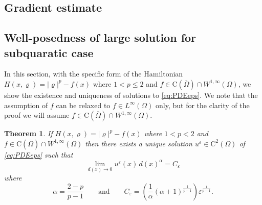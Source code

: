 \documentclass[11pt,reqno]{amsart}
\numberwithin{figure}{section}
\theoremstyle{plain}
\newtheorem{thm}{Theorem}[section]
\theoremstyle{remark}
\numberwithin{equation}{section}
\begin{document}
\subsection{Gradient estimate} 





\subsection{Well-posedness of large solution for subquaratic case}

In this section, with the specific form of the Hamiltonian $H(x,\varrho) = |\varrho|^p - f(x)$ where $1<p\leq 2$ and $f\in \mathrm{C}(\overline{\Omega})\cap W^{1,\infty}(\Omega)$, we show the existence and uniqueness of solutions to \eqref{eq:PDEeps}. 
We note that the assumption of $f$ can be relaxed to $f\in L^\infty(\Omega)$ only, but for the clarity of the proof we will assume $f\in \mathrm{C}(\overline{\Omega})\cap W^{1,\infty}(\Omega)$.

\begin{thm} If $H(x,\varrho) = |\varrho|^p - f(x)$ where $1<p< 2$ and $f\in \mathrm{C}(\overline{\Omega})\cap W^{1,\infty}(\Omega)$ then there exists a unique solution $u^\varepsilon\in \mathrm{C}^2(\Omega)$ of \eqref{eq:PDEeps} such that
\begin{equation*}
    \lim_{d(x)\to 0} u^\varepsilon(x) \,d(x)^\alpha = C_\varepsilon 
\end{equation*}
where
\begin{equation*}
    \displaystyle\alpha = \frac{2-p}{p-1} \qquad\text{and}\qquad C_\varepsilon = \left(\frac{1}{\alpha}(\alpha+1)^\frac{1}{p-1}\right) \varepsilon^{\frac{1}{p-1}}.
\end{equation*}
\end{thm}
\end{document}
